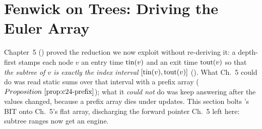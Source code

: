 \section{Fenwick on Trees: Driving the Euler Array}\label{sec:c14-trees}

\begin{previouslybox}
Chapter~5 () proved the reduction we now exploit without re-deriving
it: a depth-first  stamps each node \(v\) an entry time
\(\operatorname{tin}(v)\) and an exit time \(\operatorname{tout}(v)\) so that \emph{the subtree of \(v\) is
exactly the index interval} \([\operatorname{tin}(v),\operatorname{tout}(v)]\) ().  What
Ch.~5 could do was read static sums over that interval with a prefix array
(\(\propref{c24-prefix}\)); what it \emph{could not} do was keep answering
after the values changed, because a prefix array dies under updates.  This
section bolts 's BIT onto Ch.~5's flat array, discharging the
forward pointer Ch.~5 left here: subtree ranges now get an engine.
\end{previouslybox}

